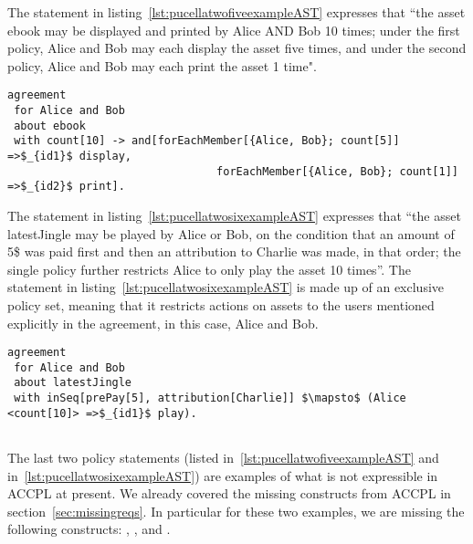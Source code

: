 %



%

The statement in listing~\ref{lst:pucellatwofiveexampleAST}  expresses that ``the asset ebook may be displayed and printed by Alice AND Bob 10 times; under the first policy, Alice and Bob may each display the asset five times, and under the second policy, Alice and Bob may each print the asset 1 time".


\lstset{language=Pucella2006}
\begin{minipage}[c]{0.95\textwidth}
\begin{lstlisting}[frame=single, caption={Agreement of Example 2.5}, label={lst:pucellatwofiveexampleAST}, mathescape]
agreement
 for Alice and Bob 
 about ebook 
 with count[10] -> and[forEachMember[{Alice, Bob}; count[5]] =>$_{id1}$ display, 
                                forEachMember[{Alice, Bob}; count[1]] =>$_{id2}$ print].
\end{lstlisting}
\end{minipage} 
%


The statement in listing~\ref{lst:pucellatwosixexampleAST}  expresses that ``the asset latestJingle may be played by Alice or Bob, on the condition that an amount of 5\$ was paid first and then an attribution to Charlie was made, in that order; the single policy further restricts Alice to only play the asset 10 times''. The statement in listing~\ref{lst:pucellatwosixexampleAST} is made up of an exclusive policy set, meaning that it restricts actions on assets to the users mentioned explicitly in the agreement, in this case, Alice and Bob.

\lstset{language=Pucella2006}
\begin{minipage}[c]{0.95\textwidth}
\begin{lstlisting}[frame=single, caption={Agreement of Example 2.6}, label={lst:pucellatwosixexampleAST}, mathescape]
agreement
 for Alice and Bob 
 about latestJingle 
 with inSeq[prePay[5], attribution[Charlie]] $\mapsto$ (Alice <count[10]> =>$_{id1}$ play). 
                                    
\end{lstlisting}
\end{minipage} 

The last two policy statements (listed in~\ref{lst:pucellatwofiveexampleAST} and in~\ref{lst:pucellatwosixexampleAST}) are examples of what is not expressible in \ac{ACCPL} at present. We already covered the missing constructs from \ac{ACCPL} in section~\ref{sec:missingreqs}. In particular for these two examples, we are missing the following constructs: , ,  and .


